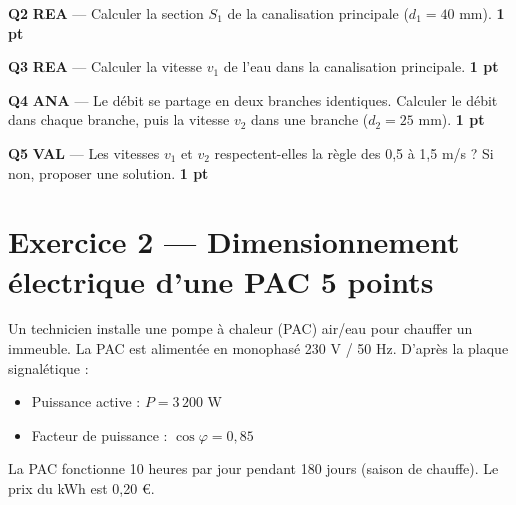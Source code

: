 \documentclass[a4paper,11pt]{article}
\newcommand{\pts}[1]{\hfill\textcolor{gris}{\small\textbf{#1}}}
\newcommand{\comp}[1]{\colorbox{blue!10}{\scriptsize\textbf{#1}}}
\begin{document}
\textbf{Q2} \comp{REA} — Calculer la section $S_1$ de la canalisation principale ($d_1 = 40$ mm). \pts{1 pt}

\begin{reponsebox}[3cm]
\dotfill

\dotfill

\dotfill
\end{reponsebox}

\textbf{Q3} \comp{REA} — Calculer la vitesse $v_1$ de l'eau dans la canalisation principale. \pts{1 pt}

\begin{reponsebox}[3cm]
\dotfill

\dotfill

\dotfill
\end{reponsebox}

\textbf{Q4} \comp{ANA} — Le débit se partage en deux branches identiques. Calculer le débit dans chaque branche, puis la vitesse $v_2$ dans une branche ($d_2 = 25$ mm). \pts{1 pt}

\begin{reponsebox}[4cm]
\dotfill

\dotfill

\dotfill

\dotfill

\dotfill
\end{reponsebox}

\textbf{Q5} \comp{VAL} — Les vitesses $v_1$ et $v_2$ respectent-elles la règle des 0,5 à 1,5 m/s ? Si non, proposer une solution. \pts{1 pt}

\begin{reponsebox}[3cm]
\dotfill

\dotfill

\dotfill
\end{reponsebox}

\newpage

\section*{Exercice 2 — Dimensionnement électrique d'une PAC \pts{5 points}}

\begin{contextebox}
Un technicien installe une pompe à chaleur (PAC) air/eau pour chauffer un immeuble. La PAC est alimentée en monophasé 230 V / 50 Hz. D'après la plaque signalétique :
\begin{itemize}[nosep]
  \item Puissance active : $P = 3\,200$ W
  \item Facteur de puissance : $\cos\varphi = 0{,}85$
\end{itemize}
La PAC fonctionne 10 heures par jour pendant 180 jours (saison de chauffe). Le prix du kWh est 0,20 €.
\end{contextebox}
\end{document}
